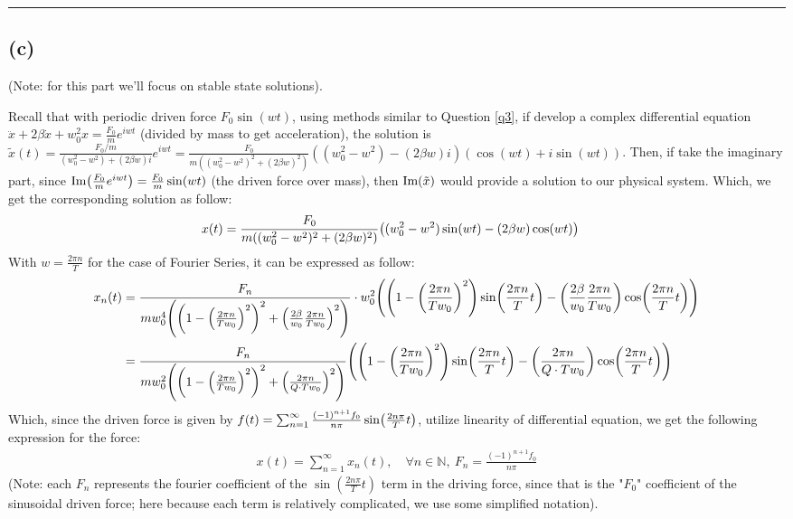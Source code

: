 \documentclass{article}
\newcommand{\NN}{\mathbb{N}}
\DeclarePairedDelimiter{\paran}{(}{)}%
\newcommand{\Imag}{\textmd{Im}} %
\begin{document}
\rule{15.24cm}{0.01mm}

\subsection*{(c)}
(Note: for this part we'll focus on stable state solutions).

Recall that with periodic driven force $F_0\sin(wt)$, using methods similar to Question \ref{q3}, if develop a complex differential equation $\ddot x+2\beta \dot x+w_0^2 x=\frac{F_0}{m}e^{iwt}$ (divided by mass to get acceleration), the solution is $\tilde{x}(t)=\frac{F_0/m}{(w_0^2-w^2)+(2\beta w)i}e^{iwt} = \frac{F_0}{m((w_0^2-w^2)^2+(2\beta w)^2)}((w_0^2-w^2)-(2\beta w)i)(\cos(wt)+i\sin(wt))$. Then, if take the imaginary part, since $\Imag\paran*{\frac{F_0}{m}e^{iwt}} = \frac{F_0}{m}\sin(wt)$ (the driven force over mass), then $\Imag(\tilde{x})$ would provide a solution to our physical system. Which, we get the corresponding solution as follow:
\begin{align}
    x(t) &= \frac{F_0}{m((w_0^2-w^2)^2+(2\beta w)^2)}\paran*{(w_0^2-w^2)\sin(wt)-(2\beta w)\cos(wt)}
\end{align}
With $w = \frac{2\pi n}{T}$ for the case of Fourier Series, it can be expressed as follow:
\begin{align}
    x_n(t)&=\frac{F_n}{mw_0^4\paran*{\paran*{1-\paran*{\frac{2\pi n}{Tw_0}}^2}^2+\paran*{\frac{2\beta}{w_0}\frac{2\pi n}{Tw_0}}^2}}\cdot w_0^2\paran*{\paran*{1-\paran*{\frac{2\pi n}{Tw_0}}^2}\sin\paran*{\frac{2\pi n}{T}t}-\paran*{\frac{2\beta}{w_0}\frac{2\pi n}{Tw_0}}\cos\paran*{\frac{2\pi n}{T}t}}\\
    &= \frac{F_n}{mw_0^2\paran*{\paran*{1-\paran*{\frac{2\pi n}{Tw_0}}^2}^2+\paran*{\frac{2\pi n}{Q\cdot Tw_0}}^2}}\paran*{\paran*{1-\paran*{\frac{2\pi n}{Tw_0}}^2}\sin\paran*{\frac{2\pi n}{T}t}-\paran*{\frac{2\pi n}{Q\cdot Tw_0}}\cos\paran*{\frac{2\pi n}{T}t}}
\end{align}
Which, since the driven force is given by $f(t) = \sum_{n=1}^{\infty}\frac{(-1)^{n+1}f_0}{n\pi}\sin\paran*{\frac{2n\pi}{T}t}$, utilize linearity of differential equation, we get the following expression for the force:
\begin{align}
    x(t)=\sum_{n=1}^{\infty}x_n(t),\quad \forall n\in \NN,\ F_n = \frac{(-1)^{n+1}f_0}{n\pi}
\end{align} 
(Note: each $F_n$ represents the fourier coefficient of the $\sin(\frac{2n\pi}{T}t)$ term in the driving force, since that is the "$F_0$" coefficient of the sinusoidal driven force; here because each term is relatively complicated, we use some simplified notation).
\end{document}
